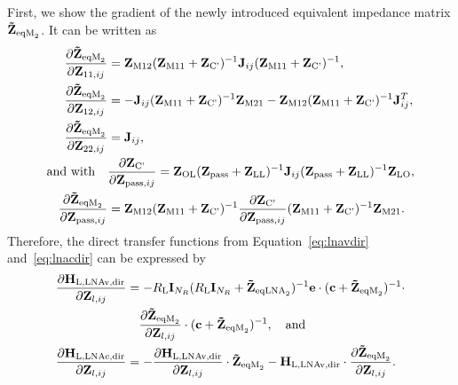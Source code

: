 First, we show the gradient of the newly introduced equivalent impedance matrix $\mathbf{\tilde{Z}}_{\text{eqM}_2}$.
It can be written as
\begin{align}
\label{eq:HLNAM_lna_grad}
\frac{\partial\mat{\tilde{Z}}_{\text{eqM}_2}}{\partial\mat{Z}_{11,ij}}&=
\mat{Z}_\text{M12} (\mat{Z}_\text{M11} + \mat{Z}_\text{C'})^{-1}
	\mat{J}_{ij}(\mat{Z}_\text{M11} + \mat{Z}_\text{C'})^{-1},\\
\frac{\partial\mat{\tilde{Z}}_{\text{eqM}_2}}{\partial\mat{Z}_{12,ij}}&=
-\mat{J}_{ij} (\mat{Z}_\text{M11} + \mat{Z}_\text{C'})^{-1} \mat{Z}_\text{M21} 
	-\mat{Z}_\text{M12} (\mat{Z}_\text{M11} + \mat{Z}_\text{C'})^{-1} \mat{J}_{ij}^T,\\
\frac{\partial\mat{\tilde{Z}}_{\text{eqM}_2}}{\partial\mat{Z}_{22,ij}}&=\mat{J}_{ij},\\\nonumber
\text{and with}\quad&
\frac{\partial\mat{Z}_\text{C'}}{\partial\mat{Z}_{\text{pass},ij}} = 
\mat{Z}_\text{OL} (\mat{Z}_{\text{pass}}+\mat{Z}_\text{LL})^{-1} \mat{J}_{ij}
	(\mat{Z}_{\text{pass}}+\mat{Z}_\text{LL})^{-1} \mat{Z}_\text{LO},\\
\frac{\partial\mat{\tilde{Z}}_{\text{eqM}_2}}{\partial\mat{Z}_{\text{pass},ij}}&=
\mat{Z}_\text{M12} (\mat{Z}_\text{M11} + \mat{Z}_\text{C'})^{-1}
	\frac{\partial\mat{Z}_\text{C'}}{\partial\mat{Z}_{\text{pass},ij}}
	(\mat{Z}_\text{M11} + \mat{Z}_\text{C'})^{-1}\mat{Z}_\text{M21}.%
\end{align}
Therefore, the direct transfer functions from Equation~\eqref{eq:lnavdir} and~\eqref{eq:lnacdir} can be expressed by
\begin{align}\label{eq:lnavdir_grad}\nonumber
\frac{\partial\mathbf{H}_\text{L,LNAv,dir}}{\partial\mathbf{Z}_{l,ij}} &=
	-R_\text{L}\mathbf{I}_{N_R}(R_\text{L}\mathbf{I}_{N_R} +
	\mathbf{\tilde{Z}}_{\text{eqLNA}_2})^{-1}\mathbf{e}\cdot
	(\mathbf{c}+\mathbf{\tilde{Z}}_{\text{eqM}_2})^{-1}\cdot\\
&\quad	\frac{\partial\mathbf{\tilde{Z}}_{\text{eqM}_2}}{\partial\mathbf{Z}_{l,ij}}\cdot
	(\mathbf{c}+\mathbf{\tilde{Z}}_{\text{eqM}_2})^{-1},\quad\text{and}\\\label{eq:lnacdir_grad}
\frac{\partial\mathbf{H}_\text{L,LNAc,dir}}{\partial\mathbf{Z}_{l,ij}} &=
	-\frac{\partial\mathbf{H}_\text{L,LNAv,dir}}{\partial\mathbf{Z}_{l,ij}}\cdot
	\mathbf{\tilde{Z}}_{\text{eqM}_2} -
	\mathbf{H}_\text{L,LNAv,dir}\cdot
	\frac{\partial\mathbf{\tilde{Z}}_{\text{eqM}_2}}{\partial\mathbf{Z}_{l,ij}}.
\end{align}


